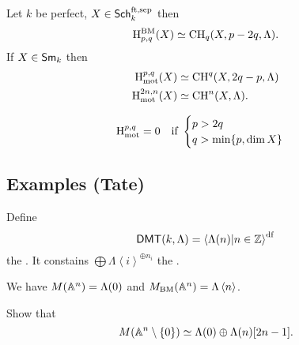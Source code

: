 \begin{theorem}
Let $k$ be perfect, $X\in \mathsf{Sch}_k^{\text{ft,sep}}$ then
\[
\mathrm{H}_{p,q}^{\text{BM}}(X)\simeq \operatorname{CH}_q(X,p-2q,\Lambda).
\]
If $X\in \mathsf{Sm}_k$ then
\begin{align*}
\mathrm{H}^{p,q}_{\text{mot}}(X) &\simeq \operatorname{CH}^{q}(X,2q-p,\Lambda) \\
\mathrm{H}_{\text{mot}}^{2n,n}(X) &\simeq \operatorname{CH}^{n}(X,\Lambda).
\end{align*}
\end{theorem}

\begin{corollary}
\[ \mathrm{H}_{\text{mot}}^{p,q}=0\quad \text{if }
\begin{cases}
p>2q\\
q>\min\{p,\dim X\}
\end{cases} \]

\end{corollary}

\subsection{Examples (Tate)}
\begin{definition}
Define
\[
\mathsf{DMT}(k,\Lambda) = \left<\Lambda(n) | n\in \mathbb Z \right>^{\text{df}}
\]
the . It constains $\bigoplus \Lambda\left<i \right>^{\oplus
n_i}$ the .
\end{definition}
We have $M(\mathbb A^{n})=\Lambda(0)$ and $M_{\text{BM}}(\mathbb A^{n}) = \Lambda\left<n \right>$.
\begin{exercise}
Show that
\[
M(\mathbb A^{n}\setminus \{0\}) \simeq \Lambda(0) \oplus \Lambda(n)[2n-1].
\]
\end{exercise}
